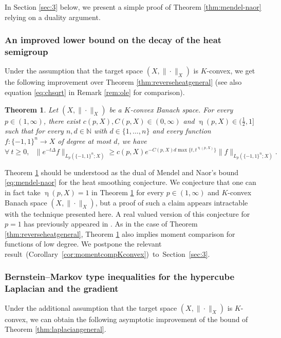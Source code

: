 \documentclass[11pt,reqno]{amsart}
\renewcommand{\geq}{\geqslant}
\newcommand{\1}{\mathbf 1}
\newtheorem{theorem}{Theorem}
\theoremstyle{remark}
\newcommand{\N}{\mathbb N}
\renewcommand{\eta}{\upeta}
\begin{document}
\noindent In Section \ref{sec:3} below, we present a simple proof of Theorem \ref{thm:mendel-naor} relying on a duality argument.

\subsubsection{An improved lower bound on the decay of the heat semigroup} Under the assumption that the target space $(X,\|\cdot\|_X)$ is $K$-convex, we get the following improvement over Theorem \ref{thm:reverseheatgeneral} (see also equation \eqref{eq:chsqrt} in Remark \ref{rem:ole} for comparison).

\begin{theorem} \label{thm:reverseheatKconvex}
Let $(X,\|\cdot\|_X)$ be a $K$-convex Banach space. For every $p\in(1,\infty)$, there exist $c(p,X), C(p,X)\in(0,\infty)$ and $\eta(p,X) \in \big(\frac{1}{2},1\big]$ such that for every $n,d\in\N$ with $d\in\{1,\ldots,n\}$ and every function $f:\{-1,1\}^n \to X$ of degree at most $d$, we have
\begin{equation} \label{eq:reverseheatKconvex}
\forall \ t\geq0, \ \ \ \|e^{-t\Delta} f\|_{L_p(\{-1,1\}^n;X)} \geq c(p,X) e^{-C(p,X)d\max\{t, t^{\eta(p,X)}\}}\|f\|_{L_p(\{-1,1\}^n;X)}.
\end{equation}
\end{theorem}

Theorem \ref{thm:reverseheatKconvex} should be understood as the dual of Mendel and Naor's bound \eqref{eq:mendel-naor} for the heat smoothing conjecture. We conjecture that one can in fact take $\eta(p,X)=1$ in Theorem \ref{thm:reverseheatKconvex} for every $p\in(1,\infty)$ and $K$-convex Banach space $(X,\|\cdot\|_X)$, but a proof of such a claim appears intractable with the technique presented here. A real valued version of this conjecture for $p=1$ has previously appeared in \cite[Section~5]{Simons}. As in the case of Theorem \ref{thm:reverseheatgeneral}, Theorem \ref{thm:reverseheatKconvex} also implies moment comparison for functions of low degree. We postpone the relevant result\mbox{ (Corollary \ref{cor:momentcompKconvex}) to Section \ref{sec:3}.}

\subsubsection{Bernstein--Markov type inequalities for the hypercube Laplacian and the gradient} Under the additional assumption that the target space $(X,\|\cdot\|_X)$ is $K$-convex, we can obtain the following asymptotic improvement of the bound of Theorem \ref{thm:laplaciangeneral}.
\end{document}
